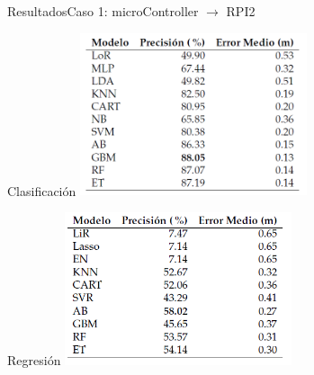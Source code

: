 \documentclass[10pt]{beamer}
\begin{document}
\begin{frame}{Resultados}{Caso 1: microController $\rightarrow$ RPI2}
\begin{multicols}{2}
\begin{block}{Clasificación}
\includegraphics[width=0.5\textwidth]{AAUgraphics/microClasificacion}
\end{block}
\begin{block}{Regresión}
\includegraphics[width=0.5\textwidth]{AAUgraphics/microRegresion}
\end{block}
\end{multicols}
\end{frame}
\end{document}
